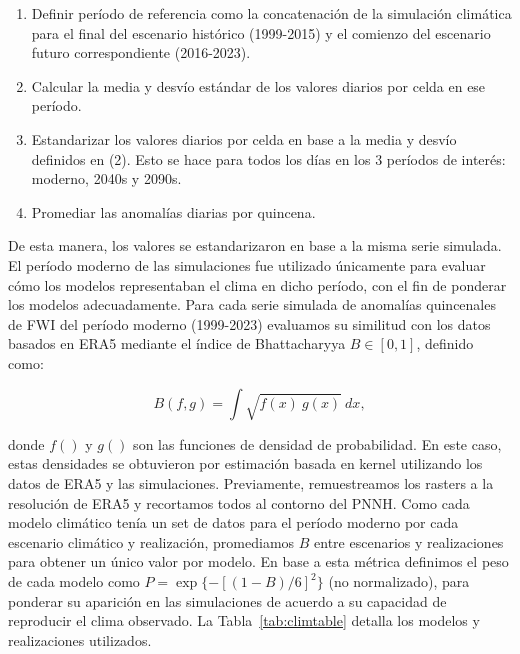 \begin{enumerate}
    \item Definir período de referencia como la concatenación de la simulación climática para el final del escenario histórico (1999-2015) y el comienzo del escenario futuro correspondiente (2016-2023). 
    \item Calcular la media y desvío estándar de los valores diarios por celda en ese período.
    \item Estandarizar los valores diarios por celda en base a la media y desvío definidos en (2). Esto se hace para todos los días en los 3 períodos de interés: moderno, 2040s y 2090s.
    \item Promediar las anomalías diarias por quincena. 
\end{enumerate}

De esta manera, los valores se estandarizaron en base a la misma serie simulada. El período moderno de las simulaciones fue utilizado únicamente para evaluar cómo los modelos representaban el clima en dicho período, con el fin de ponderar los modelos adecuadamente. Para cada serie simulada de anomalías quincenales de FWI del período moderno (1999-2023) evaluamos su similitud con los datos basados en ERA5 mediante el índice de Bhattacharyya $B \in [0, 1]$, definido como:

\[
B(f, g) = \int \sqrt{f(x) \ g(x)}\ dx,
\]

\noindent donde $f()$ y $g()$ son las funciones de densidad de probabilidad. En este caso, estas densidades se obtuvieron por estimación basada en kernel utilizando los datos de ERA5 y las simulaciones. Previamente, remuestreamos los rasters a la resolución de ERA5 y recortamos todos al contorno del PNNH. Como cada modelo climático tenía un set de datos para el período moderno por cada escenario climático y realización, promediamos $B$ entre escenarios y realizaciones para obtener un único valor por modelo. En base a esta métrica definimos el peso de cada modelo como $P = \exp\{-[(1 - B) / 6]^2\}$ (no normalizado), para ponderar su aparición en las simulaciones de acuerdo a su capacidad de reproducir el clima observado. La Tabla~\ref{tab:climtable} detalla los modelos y realizaciones utilizados.

